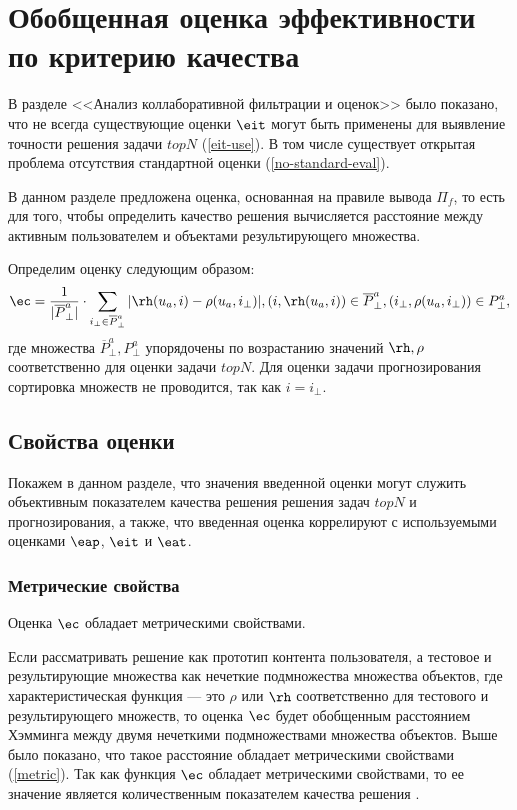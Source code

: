 %
\section{Обобщенная оценка эффективности по критерию качества}
В разделе <<Анализ коллаборативной фильтрации и оценок>> было
показано,
что не всегда существующие оценки $\eit$
могут быть применены для выявление точности решения задачи $topN$
(\ref{eit-use}). В том числе существует открытая проблема отсутствия стандартной
оценки (\ref{no-standard-eval}).

В данном разделе предложена оценка,
основанная на правиле вывода $\Pi_f$, то есть для того, чтобы
определить качество решения вычисляется расстояние между активным
пользователем и объектами результирующего множества.


Определим оценку следующим образом:
\begin{equation}
	\label{content-eff}
	\ec = \frac{1}{|\overline{P}^a_{\bot}|} \cdot
	\sum \limits_{i_{\bot} \in \overline{P}^a_{\bot}}
	|\rh(u_a, i) - \rho(u_a, i_{\bot})|,
	(i , \rh(u_a, i)) \in \overline{P}^a_{\bot},
	(i_{\bot}, \rho(u_a, i_{\bot})) \in P^a_{\bot},
\end{equation}
где множества $\overline{P}^a_{\bot}, P^a_{\bot}$ упорядочены по возрастанию
значений $\rh,\rho$ соответственно для оценки задачи $topN$.
Для оценки задачи прогнозирования сортировка множеств не проводится, так
как $i = i_{\bot}$.

\subsection{Свойства оценки}
Покажем в данном разделе, что значения введенной
оценки
могут служить объективным показателем качества решения
решения задач $topN$ и
прогнозирования, а также, что введенная оценка
коррелируют с используемыми оценками
$\eap$, $\eit$ и $\eat$.

\subsubsection{Метрические свойства}
\begin{trm}
Оценка $\ec$ обладает метрическими свойствами.
\end{trm}
Если рассматривать решение как прототип контента пользователя,
а тестовое и результирующие множества как нечеткие подмножества
множества объектов, где характеристическая функция --- это
$\rho$ или $\rh$ соответственно для тестового и результирующего
множеств, то оценка $\ec$ будет обобщенным расстоянием Хэмминга
между двумя нечеткими подмножествами множества объектов. Выше было показано,
что такое расстояние обладает метрическими свойствами (\ref{metric}).
Так как функция $\ec$ обладает метрическими свойствами, то ее значение
является количественным показателем качества решения \cite{fdca}.

